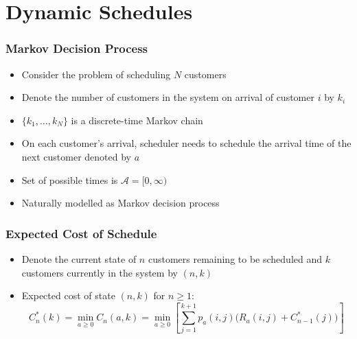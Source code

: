 \documentclass{beamer}
\begin{document}
\section{Dynamic Schedules}

\begin{frame}
	\frametitle{Markov Decision Process}

	\begin{itemize}
		\item Consider the problem of scheduling $N$ customers
		\item Denote the number of customers in the system on arrival of customer $i$ by $k_{i}$
		\item $\{ k_{1}, \ldots, k_{N} \}$ is a discrete-time Markov chain
		\item On each customer's arrival, scheduler needs to schedule the arrival time of the next customer denoted by $a$
		\item Set of possible times is $\mathcal{A} = [0, \infty)$
		\item Naturally modelled as Markov decision process
	\end{itemize}
\end{frame}

\begin{frame}
	\frametitle{Expected Cost of Schedule}

	\begin{itemize}
		\item Denote the current state of $n$ customers remaining to be scheduled and $k$ customers currently in the system by $(n, k)$
		\item Expected cost of state $(n, k)$ for $n \geq 1$:
		\begin{equation*}
			C_{n}^{*} (k) = \min_{a \geq 0} C_{n} (a, k) = \min_{a \geq 0} \left[ \sum_{j = 1}^{k + 1} p_{a} (i, j) \Big( R_{a} (i, j) + C_{n - 1}^{*} (j) \Big) \right]
		\end{equation*}
	\end{itemize}
\end{frame}
\end{document}
